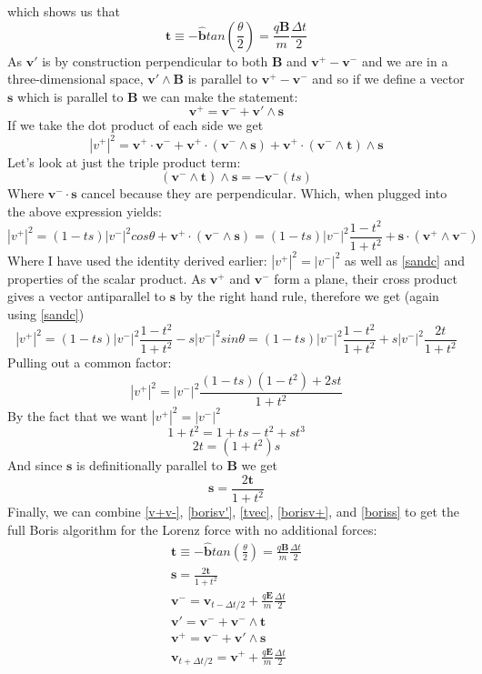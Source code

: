 \documentclass[12pt]{article}
\begin{document}
which shows us that 
\begin{equation}\label{tvec}
\textbf{t}\equiv-\hat{\textbf{b}}tan\left(\frac{\theta}{2}\right)=\frac{q\textbf{B}}{m}\frac{\Delta t}{2}
\end{equation}
As $\textbf{v}'$ is by construction perpendicular to both $\textbf{B}$ and $\textbf{v}^+-\textbf{v}^-$ and we are in a three-dimensional space, $\textbf{v}'\wedge\textbf{B}$ is parallel to $\textbf{v}^+-\textbf{v}^-$ and so if we define a vector $\textbf{s}$ which is parallel to $\textbf{B}$ we can make the statement:
\begin{equation}\label{borisv+}
\textbf{v}^+=\textbf{v}^-+\textbf{v}'\wedge\textbf{s}
\end{equation} 
If we take the dot product of each side we get
$$|v^+|^2=\textbf{v}^+\cdot\textbf{v}^-+\textbf{v}^+\cdot(\textbf{v}^-\wedge\textbf{s})+\textbf{v}^+\cdot(\textbf{v}^-\wedge\textbf{t})\wedge\textbf{s}$$
Let's look at just the triple product term:
$$(\textbf{v}^-\wedge\textbf{t})\wedge\textbf{s}=-\textbf{v}^-(ts)$$
Where $\textbf{v}^-\cdot\textbf{s}$ cancel because they are perpendicular. Which, when plugged into the above expression yields:
$$|v^+|^2=(1-ts)|v^-|^2cos\theta+\textbf{v}^+\cdot(\textbf{v}^-\wedge\textbf{s})=(1-ts)|v^-|^2\frac{1-t^2}{1+t^2}+\textbf{s}\cdot(\textbf{v}^+\wedge\textbf{v}^-)$$ 
Where I have used the identity derived earlier: $|v^+|^2=|v^-|^2$ as well as \eqref{sandc} and properties of the scalar product. As $\textbf{v}^+$ and $\textbf{v}^-$ form a plane, their cross product gives a vector antiparallel to $\textbf{s}$ by the right hand rule, therefore we get (again using \eqref{sandc})
$$|v^+|^2=(1-ts)|v^-|^2\frac{1-t^2}{1+t^2}-s|v^-|^2sin\theta=(1-ts)|v^-|^2\frac{1-t^2}{1+t^2}+s|v^-|^2\frac{2t}{1+t^2}$$
Pulling out a common factor:
$$|v^+|^2=|v^-|^2\frac{(1-ts)(1-t^2)+2st}{1+t^2}$$
By the fact that we want $|v^+|^2=|v^-|^2$
$$1+t^2=1+ts-t^2+st^3$$
$$2t=(1+t^2)s$$
And since $\textbf{s}$ is definitionally parallel to $\textbf{B}$ we get
\begin{equation}\label{boriss}
\textbf{s}=\frac{2\textbf{t}}{1+t^2}
\end{equation}
Finally, we can combine \eqref{v+v-}, \eqref{borisv'}, \eqref{tvec}, \eqref{borisv+}, and \eqref{boriss} to get the full Boris algorithm for the Lorenz force with no additional forces:
\begin{equation}\label{borisalgorithm}
\begin{split}
\textbf{t}\equiv-\hat{\textbf{b}}tan\left(\frac{\theta}{2}\right)=\frac{q\textbf{B}}{m}\frac{\Delta t}{2}\\
\textbf{s}=\frac{2\textbf{t}}{1+t^2}\\
\textbf{v}^-=\textbf{v}_{t-\Delta t/2}+\frac{q\textbf{E}}{m}\frac{\Delta t}{2}\\
\textbf{v}'=\textbf{v}^-+\textbf{v}^-\wedge\textbf{t}\\
\textbf{v}^+=\textbf{v}^-+\textbf{v}'\wedge\textbf{s}\\
\textbf{v}_{t+\Delta t/2}=\textbf{v}^++\frac{q\textbf{E}}{m}\frac{\Delta t}{2}
\end{split}
\end{equation}
\end{document}
